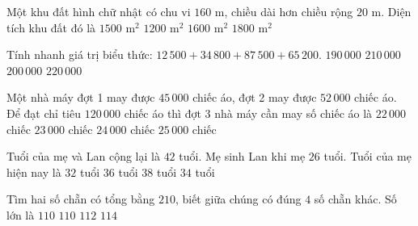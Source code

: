 \begin{ex} %
Một khu đất hình chữ nhật có chu vi $160\text{ m}$, chiều dài hơn chiều rộng $20\text{ m}$. Diện tích khu đất đó là
\choice
{\True $1500\text{ m}^2$}
{$1200\text{ m}^2$}
{$1600\text{ m}^2$}
{$1800\text{ m}^2$}
\end{ex}

\begin{ex} %
Tính nhanh giá trị biểu thức: $12\,500 + 34\,800 + 87\,500 + 65\,200$.
\choice
{$190\,000$}
{$210\,000$}
{\True $200\,000$}
{$220\,000$}
\end{ex}

\begin{ex} %
Một nhà máy đợt 1 may được $45\,000$ chiếc áo, đợt 2 may được $52\,000$ chiếc áo. Để đạt chỉ tiêu $120\,000$ chiếc áo thì đợt 3 nhà máy cần may số chiếc áo là
\choice
{$22\,000$ chiếc}
{\True $23\,000$ chiếc}
{$24\,000$ chiếc}
{$25\,000$ chiếc}
\end{ex}

\begin{ex} %
Tuổi của mẹ và Lan cộng lại là $42$ tuổi. Mẹ sinh Lan khi mẹ $26$ tuổi. Tuổi của mẹ hiện nay là
\choice
{$32$ tuổi}
{$36$ tuổi}
{$38$ tuổi}
{\True $34$ tuổi}
\end{ex}

\begin{ex} %
Tìm hai số chẵn có tổng bằng $210$, biết giữa chúng có đúng $4$ số chẵn khác. Số lớn là
\choice
{\True $110$}
{$110$}
{$112$}
{$114$}
\end{ex}

